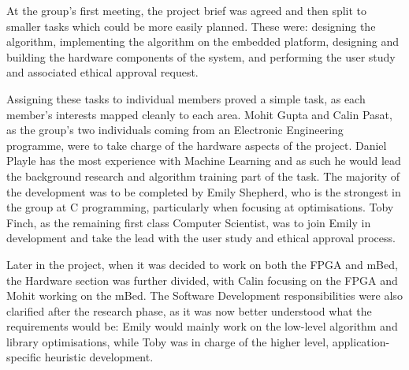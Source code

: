  \label{sec:division}

At the group's first meeting, the project brief was agreed and then split to smaller tasks which could be more easily planned. These were: designing the algorithm, implementing the algorithm on the embedded platform, designing and building the hardware components of the system, and performing the user study and associated ethical approval request.

Assigning these tasks to individual members proved a simple task, as each member's interests mapped cleanly to each area. Mohit Gupta and Calin Pasat, as the group's two individuals coming from an Electronic Engineering programme, were to take charge of the hardware aspects of the project. Daniel Playle has the most experience with Machine Learning and as such he would lead the background research and algorithm training part of the task. The majority of the development was to be completed by Emily Shepherd, who is the strongest in the group at C programming, particularly when focusing at optimisations. Toby Finch, as the remaining first class Computer Scientist, was to join Emily in development and take the lead with the user study and ethical approval process.

Later in the project, when it was decided to work on both the FPGA and mBed, the Hardware section was further divided, with Calin focusing on the FPGA and Mohit working on the mBed. The Software Development responsibilities were also clarified after the research phase, as it was now better understood what the requirements would be: Emily would mainly work on the low-level algorithm and library optimisations, while Toby was in charge of the higher level, application-specific heuristic development.
